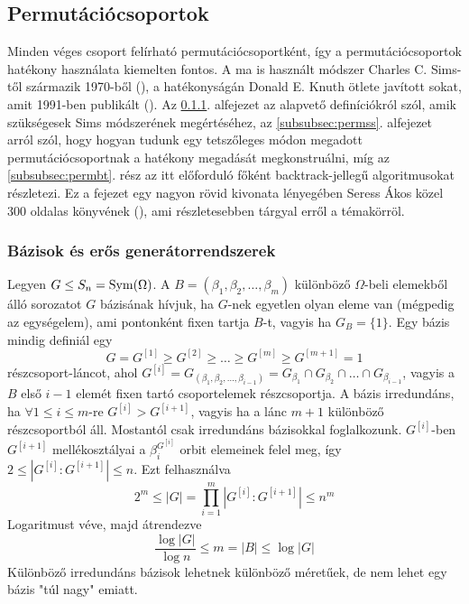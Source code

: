 \subsection{Permutációcsoportok}
\label{subsec:permutacio}
Minden véges csoport felírható permutációcsoportként, így a permutációcsoportok hatékony használata kiemelten fontos.
A ma is használt módszer Charles C. Sims-től származik 1970-ből (\cite{Sim70}), a hatékonyságán Donald E. Knuth ötlete javított sokat, amit 1991-ben publikált (\cite{Knu91}).
Az \ref{subsubsec:permdef}. alfejezet az alapvető definíciókról szól, amik szükségesek Sims módszerének megértéséhez,
az \ref{subsubsec:permss}. alfejezet arról szól, hogy hogyan tudunk egy tetszőleges módon megadott permutációcsoportnak a hatékony megadását megkonstruálni,
míg az \ref{subsubsec:permbt}. rész az itt előforduló főként backtrack-jellegű algoritmusokat részletezi.
Ez a fejezet egy nagyon rövid kivonata lényegében Seress Ákos közel 300 oldalas könyvének (\cite{Ser03}), ami részletesebben tárgyal erről a témakörröl.

\subsubsection{Bázisok és erős generátorrendszerek}
\label{subsubsec:permdef}
Legyen $G \le S_n = \operatorname{Sym}(\Omega)$.
A $B=(\beta_1,\beta_2,\dots,\beta_m)$ különböző $\Omega$-beli elemekből álló sorozatot $G$ bázisának hívjuk,
ha $G$-nek egyetlen olyan eleme van (mégpedig az egységelem), ami pontonként fixen tartja $B$-t, vagyis ha $G_B=\{1\}$.
Egy bázis mindig definiál egy
\begin{equation}
\label{eq:permlanc}
G = G^{[1]} \ge G^{[2]} \ge \dots \ge G^{[m]} \ge G^{[m+1]} = 1
\end{equation}
részcsoport-láncot, ahol $G^{[i]}=G_{(\beta_1,\beta_2,\dots,\beta_{i-1})}=G_{\beta_1}\cap G_{\beta_2}\cap\dots\cap G_{\beta_{i-1}}$, vagyis a $B$ első $i-1$ elemét fixen tartó csoportelemek részcsoportja.
A bázis irredundáns, ha $\forall 1\le i \le m$-re $G^{[i]} > G^{[i+1]}$, vagyis ha a lánc $m+1$ különböző részcsoportból áll.
Mostantól csak irredundáns bázisokkal foglalkozunk.
$G^{[i]}$-ben $G^{[i+1]}$ mellékosztályai a $\beta_i^{G^{[i]}}$ orbit elemeinek felel meg, így $2 \le \left| G^{[i]} : G^{[i+1]} \right| \le n$.
Ezt felhasználva
\begin{equation}
\label{eq:permmeret}
2^m \le |G|=\prod_{i=1}^m \left| G^{[i]} : G^{[i+1]} \right| \le n^m
\end{equation}
Logaritmust véve, majd átrendezve
\begin{equation}
\label{eq:permmeret2}
\frac{\log |G|}{\log n} \le m = |B| \le \log |G|
\end{equation}
Különböző irredundáns bázisok lehetnek különböző méretűek, de nem lehet egy bázis "túl nagy" emiatt.

